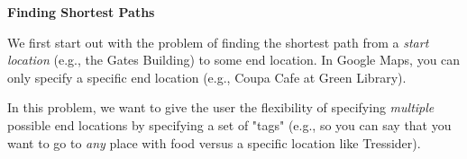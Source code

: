 \item {\bf Finding Shortest Paths}

We first start out with the problem of finding the shortest path from a \textit{start location} (e.g., the Gates Building) to some end location. In Google Maps, you can only specify a specific end location (e.g., Coupa Cafe at Green Library).
  
In this problem, we want to give the user the flexibility of specifying \textit{multiple} possible end locations by specifying a set of "tags" (e.g., so you can say that you want to go to \textit{any} place with food versus a specific location like Tressider).

\begin{enumerate}

  

  

\end{enumerate}
